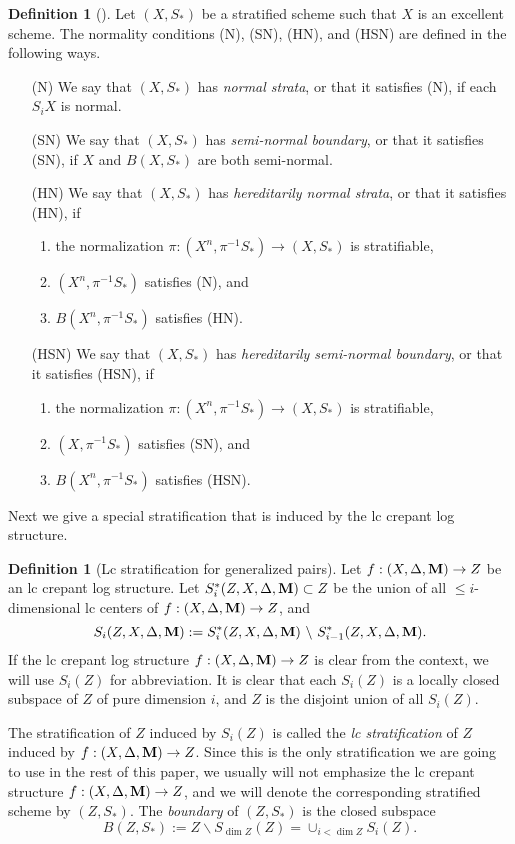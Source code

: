 \documentclass[11pt]{amsart}
\numberwithin{equation}{section}
\newcommand{\Mm}{{\bf{M}}}
\theoremstyle{definition}
\newtheorem{defn}[thm]{Definition}
\theoremstyle{definition}
\theoremstyle{definition}
\begin{document}
\begin{defn}[{\cite[Definition 9.18]{Kol13}}]
Let $(X,S_*)$ be a stratified scheme such that $X$ is an excellent scheme. The normality conditions (N), (SN), (HN), and (HSN)  are defined in the following ways.
\begin{enumerate}
    \item[(N)] We say that $(X,S_*)$ has {\it normal strata}, or that it satisfies (N), if each $S_iX$ is normal.
    \item[(SN)] We say that $(X,S_*)$ has {\it semi-normal boundary}, or that it satisfies (SN), if $X$ and $B(X,S_*)$ are both semi-normal.
    \item[(HN)] We say that $(X,S_*)$ has {\it hereditarily normal strata}, or that it satisfies (HN), if \begin{enumerate}
            \item the normalization $\pi: (X^n,\pi^{-1}S_*)\to (X,S_*)$ is stratifiable,
            \item $(X^n,\pi^{-1}S_*)$ satisfies (N), and
            \item $B(X^n,\pi^{-1}S_*)$ satisfies (HN).
    \end{enumerate}       
    \item[(HSN)] We say that $(X,S_*)$ has {\it hereditarily semi-normal boundary}, or that it
    satisfies (HSN), if \begin{enumerate}
            \item the normalization $\pi: (X^n,\pi^{-1}S_*)\to (X,S_*)$ is stratifiable,
            \item $(X,\pi^{-1}S_*)$ satisfies (SN), and
            \item $B(X^n,\pi^{-1}S_*)$ satisfies (HSN).
    \end{enumerate}
\end{enumerate}
\end{defn}

Next we give a special stratification that is induced by the lc crepant log structure. 

\begin{defn}[Lc stratification for generalized pairs]
Let $f:(X,\Delta,\Mm)\to Z$ be an lc crepant log structure. Let $S^*_i(Z,X,\Delta,\Mm)\subset Z$ be the union of all $\le i$-dimensional lc centers of $f:(X,\Delta,\Mm)\to Z$, and
$$
S_i(Z,X,\Delta,\Mm):=S^*_i(Z,X,\Delta,\Mm)~\backslash ~S^*_{i-1}(Z,X,\Delta,\Mm).
$$
If the lc crepant log structure $f:(X,\Delta,\Mm)\to Z$ is clear from the context, we will use $S_i(Z)$ for abbreviation. It is clear that each $S_i(Z)$ is a locally closed subspace of $Z$ of pure dimension $i$, and $Z$ is the disjoint union of all $S_i(Z)$. 

The stratification of $Z$ induced by $S_i(Z)$ is called the \emph{lc stratification} of $Z$ induced by $f:(X,\Delta,\Mm)\to Z$.  Since this is the only stratification we are going to use in the rest of this paper, we usually will not emphasize the lc crepant structure $f:(X,\Delta,\Mm)\to Z$, and we will denote the corresponding stratified scheme by $(Z,S_*)$. The \emph{boundary} of $(Z,S_*)$ is the closed subspace
$$B(Z,S_*):=Z\backslash S_{\dim Z}(Z)=\cup_{i<\dim Z}S_i(Z).$$
\end{defn}
\end{document}
